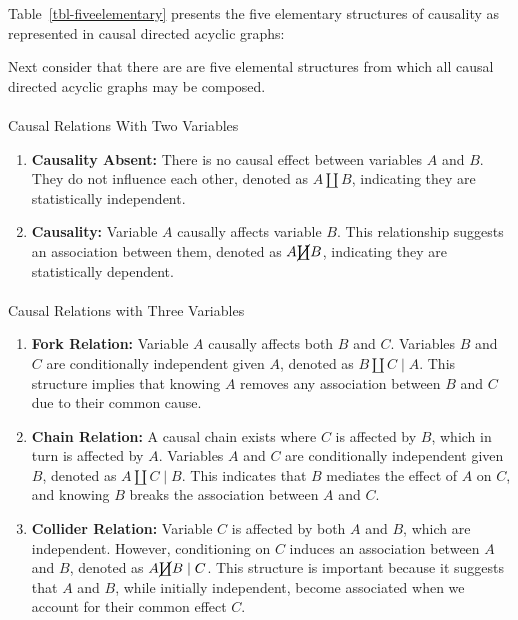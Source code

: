 \documentclass[
  single column]{article}
\makeatletter
\let\oldparagraph\paragraph
\renewcommand{\paragraph}{
    \@ifstar
      \xxxParagraphStar
      \xxxParagraphNoStar
  }
\newcommand{\xxxParagraphStar}[1]{\oldparagraph*{#1}\mbox{}}
\newcommand{\xxxParagraphNoStar}[1]{\oldparagraph{#1}\mbox{}}
\providecommand{\tightlist}{%
  \setlength{\itemsep}{0pt}\setlength{\parskip}{0pt}}\usepackage{longtable,booktabs,array}
\makeatother
\begin{document}
Table~\ref{tbl-fiveelementary} presents the five elementary structures
of causality as represented in causal directed acyclic graphs:

Next consider that there are are five elemental structures from which
all causal directed acyclic graphs may be composed.

\paragraph{Causal Relations With Two
Variables}\label{causal-relations-with-two-variables}

\begin{enumerate}
\def\labelenumi{\arabic{enumi}.}
\tightlist
\item
  \textbf{Causality Absent:} There is no causal effect between variables
  \(A\) and \(B\). They do not influence each other, denoted as
  \(A \coprod B\), indicating they are statistically independent.
\item
  \textbf{Causality:} Variable \(A\) causally affects variable \(B\).
  This relationship suggests an association between them, denoted as
  \(A \cancel{\coprod} B\), indicating they are statistically dependent.
\end{enumerate}

\paragraph{Causal Relations with Three
Variables}\label{causal-relations-with-three-variables}

\begin{enumerate}
\def\labelenumi{\arabic{enumi}.}
\setcounter{enumi}{2}
\tightlist
\item
  \textbf{Fork Relation:} Variable \(A\) causally affects both \(B\) and
  \(C\). Variables \(B\) and \(C\) are conditionally independent given
  \(A\), denoted as \(B \coprod C \mid A\). This structure implies that
  knowing \(A\) removes any association between \(B\) and \(C\) due to
  their common cause.
\item
  \textbf{Chain Relation:} A causal chain exists where \(C\) is affected
  by \(B\), which in turn is affected by \(A\). Variables \(A\) and
  \(C\) are conditionally independent given \(B\), denoted as
  \(A \coprod C \mid B\). This indicates that \(B\) mediates the effect
  of \(A\) on \(C\), and knowing \(B\) breaks the association between
  \(A\) and \(C\).
\item
  \textbf{Collider Relation:} Variable \(C\) is affected by both \(A\)
  and \(B\), which are independent. However, conditioning on \(C\)
  induces an association between \(A\) and \(B\), denoted as
  \(A \cancel{\coprod} B \mid C\). This structure is important because
  it suggests that \(A\) and \(B\), while initially independent, become
  associated when we account for their common effect \(C\).
\end{enumerate}
\end{document}
